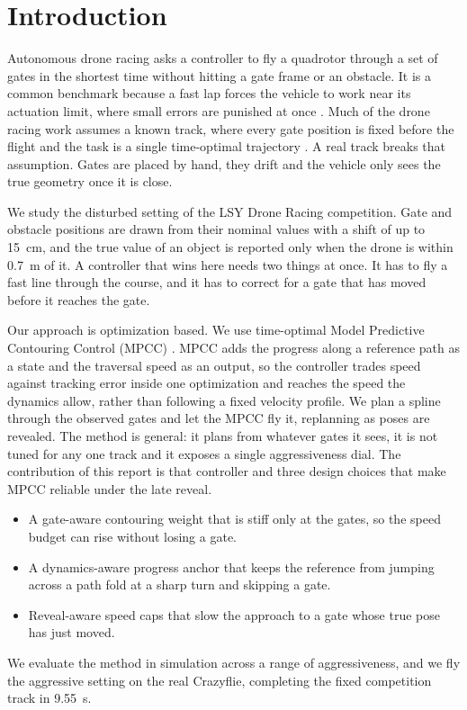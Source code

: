 \documentclass[conference]{IEEEtran}
\begin{document}
\section{Introduction}
Autonomous drone racing asks a controller to fly a quadrotor through a set of gates in the shortest time without hitting a gate frame or an obstacle. It is a common benchmark because a fast lap forces the vehicle to work near its actuation limit, where small errors are punished at once \cite{survey}. Much of the drone racing work assumes a known track, where every gate position is fixed before the flight and the task is a single time-optimal trajectory \cite{foehn,minsnap}. A real track breaks that assumption. Gates are placed by hand, they drift and the vehicle only sees the true geometry once it is close.

We study the disturbed setting of the LSY Drone Racing competition. Gate and obstacle positions are drawn from their nominal values with a shift of up to 15~cm, and the true value of an object is reported only when the drone is within 0.7~m of it. A controller that wins here needs two things at once. It has to fly a fast line through the course, and it has to correct for a gate that has moved before it reaches the gate.

Our approach is optimization based. We use time-optimal Model Predictive Contouring Control (MPCC) \cite{mpcc,lam}. MPCC adds the progress along a reference path as a state and the traversal speed as an output, so the controller trades speed against tracking error inside one optimization and reaches the speed the dynamics allow, rather than following a fixed velocity profile. We plan a spline through the observed gates and let the MPCC fly it, replanning as poses are revealed. The method is general: it plans from whatever gates it sees, it is not tuned for any one track and it exposes a single aggressiveness dial. The contribution of this report is that controller and three design choices that make MPCC reliable under the late reveal.
\begin{itemize}
\item A gate-aware contouring weight that is stiff only at the gates, so the speed budget can rise without losing a gate.
\item A dynamics-aware progress anchor that keeps the reference from jumping across a path fold at a sharp turn and skipping a gate.
\item Reveal-aware speed caps that slow the approach to a gate whose true pose has just moved.
\end{itemize}
We evaluate the method in simulation across a range of aggressiveness, and we fly the aggressive setting on the real Crazyflie, completing the fixed competition track in 9.55~s.
\end{document}

